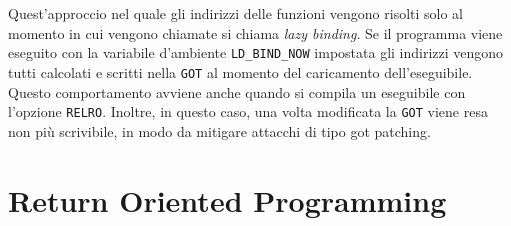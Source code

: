 Quest'approccio nel quale gli indirizzi delle funzioni vengono risolti
solo al momento in cui vengono chiamate si chiama \emph{lazy
  binding}. Se il programma viene eseguito con la variabile d'ambiente
\lstinline{LD_BIND_NOW} impostata gli indirizzi vengono tutti
calcolati e scritti nella \lstinline{GOT} al momento del caricamento
dell'eseguibile. Questo comportamento avviene anche quando si compila
un eseguibile con l'opzione \lstinline{RELRO}. Inoltre, in questo
caso, una volta modificata la \lstinline{GOT} viene resa non più
scrivibile, in modo da mitigare attacchi di tipo got patching.


\section{Return Oriented Programming}

